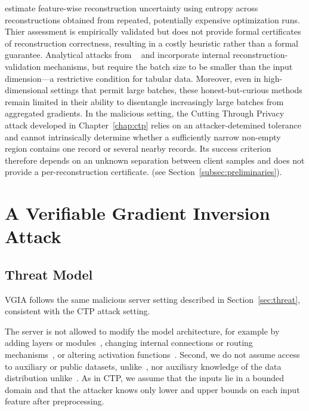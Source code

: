  estimate feature-wise reconstruction uncertainty using entropy across reconstructions obtained from repeated, potentially expensive optimization runs. Thier assessment is empirically validated but does not provide formal certificates of reconstruction correctness, resulting in a costly heuristic rather than a formal guarantee. Analytical attacks from ~ and  incorporate internal reconstruction-validation mechanisms, but require the batch size to be smaller than the input dimension—a restrictive condition for tabular data. Moreover, even in high-dimensional settings that permit large batches, these honest-but-curious methods remain limited in their ability to disentangle increasingly large batches from aggregated gradients. In the malicious setting, the Cutting Through Privacy attack developed in Chapter~\ref{chap:ctp} relies on an attacker-detemined tolerance and cannot intrinsically determine whether a sufficiently narrow non-empty region contains one record or several nearby records. Its success criterion therefore depends on an unknown separation between client samples and does not provide a per-reconstruction certificate. (see Section~\ref{subsec:preliminaries}).

\section{A Verifiable Gradient Inversion Attack}
\subsection{Threat Model}\label{sec:vgia_threat_model}
VGIA follows the same malicious server setting described in Section~\ref{sec:threat}, consistent with the CTP attack setting.

The server is not allowed to modify the model architecture, for example by adding layers or modules~\cite{fowlRobbingFedDirectly2021,fowlDecepticonsCorruptedTransformers2022,zhaoLOKILargescaleData2023a,shiScaleMIAScalableModel2025}, changing internal connections or routing mechanisms~\cite{fowlDecepticonsCorruptedTransformers2022,chu2023panning}, or altering activation functions~\cite{fowlRobbingFedDirectly2021}. Second, we do not assume access to auxiliary or public datasets, unlike~\cite{boenischWhenCuriousAbandon2023,ZHANG2023119421,garovHidingPlainSight2024,shiScaleMIAScalableModel2025}, nor auxiliary knowledge of the data distribution unlike~\cite{fowlRobbingFedDirectly2021,fowlDecepticonsCorruptedTransformers2022,shiScaleMIAScalableModel2025}.
As in CTP, we assume that the inputs lie in a bounded domain and that the attacker knows only lower and upper bounds on each input feature after preprocessing.

